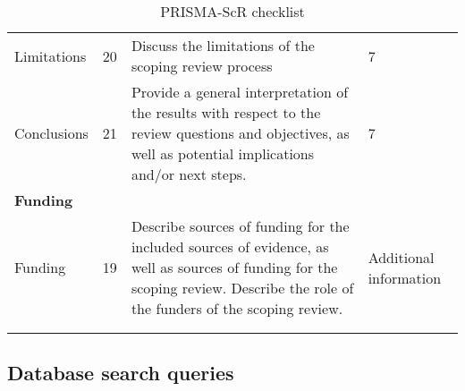 \begin{longtable}{p{3cm} p{1cm} p{6cm} p{1.5cm}}
\addlinespace
Limitations & 20 & Discuss the limitations of the scoping review process & 7 \\
\addlinespace
Conclusions & 21 & Provide a general interpretation of the results with respect to the review questions and objectives, as well as potential implications and/or next steps. & 7 \\
\addlinespace
\hline
\addlinespace
\textbf{Funding} &  &  & \\
\addlinespace
\hline
\addlinespace
Funding & 19 & Describe sources of funding for the included sources of evidence, as well as sources of funding for the scoping review. Describe the role of the funders of the scoping review. & Additional information \\
\addlinespace

\bottomrule
\addlinespace
\caption{PRISMA-ScR checklist \cite{tricco2018prisma}} \\
\label{tab:checklist}
\end{longtable}


\newpage
\subsection{Database search queries}\label{queries}

